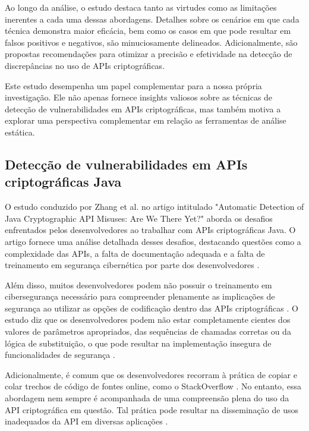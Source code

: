 Ao longo da análise, o estudo destaca tanto as virtudes como as limitações inerentes a cada uma dessas abordagens. Detalhes sobre os cenários em que cada técnica demonstra maior eficácia, bem como os casos em que pode resultar em falsos positivos e negativos, são minuciosamente delineados. Adicionalmente, são propostas recomendações para otimizar a precisão e efetividade na detecção de discrepâncias no uso de APIs criptográficas.

Este estudo desempenha um papel complementar para a nossa própria investigação. Ele não apenas fornece insights valiosos sobre as técnicas de detecção de vulnerabilidades em APIs criptográficas, mas também motiva a explorar uma perspectiva complementar em relação as ferramentas de análise estática. 

\subsection{Detecção de vulnerabilidades em APIs criptográficas Java} %

O estudo conduzido por Zhang et al. no artigo intitulado "Automatic Detection of Java Cryptographic API Misuses: Are We There Yet?" \cite{api_misuses_zhang} aborda os desafios enfrentados pelos desenvolvedores ao trabalhar com APIs criptográficas Java. O artigo fornece uma análise detalhada desses desafios, destacando questões como a complexidade das APIs, a falta de documentação adequada e a falta de treinamento em segurança cibernética por parte dos desenvolvedores \cite{api_misuses_zhang}.

Além disso, muitos desenvolvedores podem não possuir o treinamento em cibersegurança necessário para compreender plenamente as implicações de segurança ao utilizar as opções de codificação dentro das APIs criptográficas \cite{api_misuses_zhang}. O estudo diz que os desenvolvedores podem não estar completamente cientes dos valores de parâmetros apropriados, das sequências de chamadas corretas ou da lógica de substituição, o que pode resultar na implementação insegura de funcionalidades de segurança \cite{api_misuses_zhang}.

Adicionalmente, é comum que os desenvolvedores recorram à prática de copiar e colar trechos de código de fontes online, como o StackOverflow \cite{api_misuses_zhang}. No entanto, essa abordagem nem sempre é acompanhada de uma compreensão plena do uso da API criptográfica em questão. Tal prática pode resultar na disseminação de usos inadequados da API em diversas aplicações \cite{api_misuses_zhang}.

